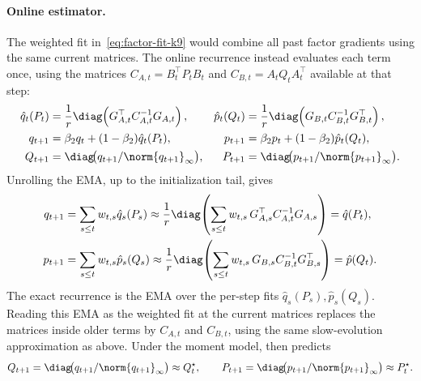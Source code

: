 \paragraph{Online estimator.}
The weighted fit in~\eqref{eq:factor-fit-k9} would combine all past
factor gradients using the same current matrices. The online recurrence
instead evaluates each term once, using the matrices
$C_{A,t}=B_t^\top P_tB_t$ and
$C_{B,t}=A_tQ_tA_t^\top$ available at that step:
\begin{equation}\label{eq:ours-klcoupling-k9}
\begin{aligned}
  \hat{q}_t(P_t)
    &= \frac1r\diag\!\left(G_{A,t}^\top C_{A,t}^{-1}G_{A,t}\right),
  &
  \hat{p}_t(Q_t)
    &= \frac1r\diag\!\left(G_{B,t}C_{B,t}^{-1}G_{B,t}^\top\right),
  \\
  q_{t+1}
    &= \beta_2q_t+(1-\beta_2)\hat{q}_t(P_t),
  &
  p_{t+1}
    &= \beta_2p_t+(1-\beta_2)\hat{p}_t(Q_t),
  \\
  Q_{t+1}
    &= \diag\!\bigl(q_{t+1}/\norm{q_{t+1}}_\infty\bigr),
  &
  P_{t+1}
    &= \diag\!\bigl(p_{t+1}/\norm{p_{t+1}}_\infty\bigr).
\end{aligned}
\end{equation}
Unrolling the EMA, up to the initialization tail, gives
\[
\begin{aligned}
  q_{t+1}
  &=
  \sum_{s\le t}w_{t,s}\hat q_s(P_s)
  \approx
  \frac1r\diag\!\left(
    \sum_{s\le t}w_{t,s}\,G_{A,s}^\top C_{A,t}^{-1}G_{A,s}
  \right)
  =
  \hat q(P_t),\\
  p_{t+1}
  &=
  \sum_{s\le t}w_{t,s}\hat p_s(Q_s)
  \approx
  \frac1r\diag\!\left(
    \sum_{s\le t}w_{t,s}\,G_{B,s}C_{B,t}^{-1}G_{B,s}^\top
  \right)
  =
  \hat p(Q_t).
\end{aligned}
\]
The exact recurrence is the EMA over the per-step fits
$\hat q_s(P_s),\hat p_s(Q_s)$. Reading this EMA as the weighted fit at
the current matrices replaces the matrices inside older terms by
$C_{A,t}$ and $C_{B,t}$, using the same slow-evolution approximation as
above. Under the moment model,
 then predicts
\[
  Q_{t+1}
  =
  \diag\!\bigl(q_{t+1}/\norm{q_{t+1}}_\infty\bigr)
  \approx Q^\star_t,
  \qquad
  P_{t+1}
  =
  \diag\!\bigl(p_{t+1}/\norm{p_{t+1}}_\infty\bigr)
  \approx P^\star_t .
\]

